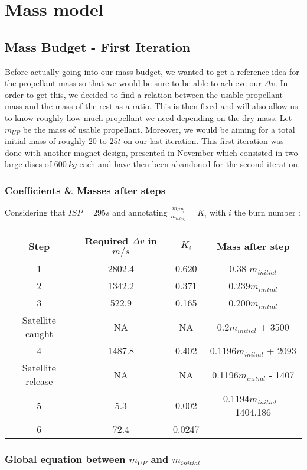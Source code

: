 \chapter{Mass model}
\section{Mass Budget - First Iteration}

\qquad Before actually going into our mass budget, we wanted to get a reference
idea for the propellant mass so that we would be sure to be able to
achieve our \(\Delta v\). In order to get this, we decided to find a
relation between the usable propellant mass and the mass of the rest as
a ratio. This is then fixed and will also allow us to know roughly how
much propellant we need depending on the dry mass. Let \(m_{UP}\) be the
mass of usable propellant. Moreover, we would be aiming for a total initial mass of roughly $20$ to $25t$ on our last iteration. This first iteration was done with another magnet design, presented in November which consisted in two large discs of $600\ kg$ each and have then been abandoned for the second iteration.


\subsection{Coefficients \& Masses after steps}

Considering that \(ISP = 295s\) and annotating
\(\frac{m_{UP_i}}{m_{total_i}} = K_i\) with \(i\) the burn number :

\begin{longtable}[]{@{}cccc@{}}
\toprule
Step & Required \(\Delta v\) in \(m/s\) & \(K_i\) & Mass after
step\tabularnewline
\midrule
\endhead
1 & 2802.4 & 0.620 & 0.38 \(m_{initial}\)\tabularnewline
2 & 1342.2 & 0.371 & 0.239\(m_{initial}\)\tabularnewline
3 & 522.9 & 0.165 & 0.200\(m_{initial}\)\tabularnewline
Satellite caught & NA & NA & 0.2\(m_{initial}\) + 3500\tabularnewline
4 & 1487.8 & 0.402 & 0.1196\(m_{initial}\) + 2093\tabularnewline
Satellite release & NA & NA & 0.1196\(m_{initial}\) -
1407\tabularnewline
5 & 5.3 & 0.002 & 0.1194\(m_{initial}\) - 1404.186\tabularnewline
6 & 72.4 & 0.0247 &\tabularnewline
\bottomrule
\end{longtable}


\subsection{Global equation between $m_{UP}$ and
	$m_{initial}$}

